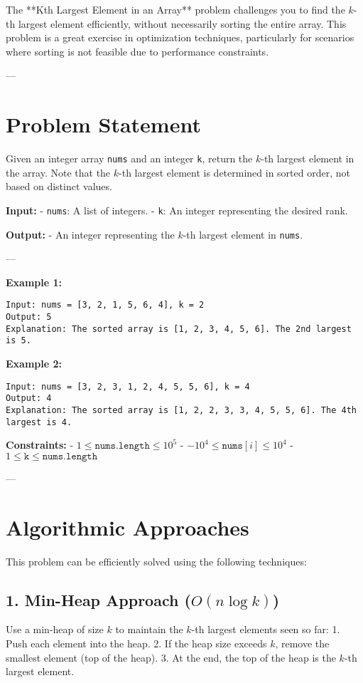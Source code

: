 
\label{problem:Kth_Largest_Element}

The **Kth Largest Element in an Array** problem challenges you to find the \(k\)-th largest element efficiently, without necessarily sorting the entire array. This problem is a great exercise in optimization techniques, particularly for scenarios where sorting is not feasible due to performance constraints.

---

\section*{Problem Statement}
Given an integer array \texttt{nums} and an integer \texttt{k}, return the \(k\)-th largest element in the array. Note that the \(k\)-th largest element is determined in sorted order, not based on distinct values.

\textbf{Input:}
- \texttt{nums}: A list of integers.
- \texttt{k}: An integer representing the desired rank.

\textbf{Output:}
- An integer representing the \(k\)-th largest element in \texttt{nums}.

---

\textbf{Example 1:}
\begin{verbatim}
Input: nums = [3, 2, 1, 5, 6, 4], k = 2
Output: 5
Explanation: The sorted array is [1, 2, 3, 4, 5, 6]. The 2nd largest is 5.
\end{verbatim}

\textbf{Example 2:}
\begin{verbatim}
Input: nums = [3, 2, 3, 1, 2, 4, 5, 5, 6], k = 4
Output: 4
Explanation: The sorted array is [1, 2, 2, 3, 3, 4, 5, 5, 6]. The 4th largest is 4.
\end{verbatim}

\textbf{Constraints:}
- \(1 \leq \texttt{nums.length} \leq 10^5\)
- \(-10^4 \leq \texttt{nums}[i] \leq 10^4\)
- \(1 \leq \texttt{k} \leq \texttt{nums.length}\)

---

\section*{Algorithmic Approaches}

This problem can be efficiently solved using the following techniques:

\subsection*{1. Min-Heap Approach (\(O(n \log k)\))}
Use a min-heap of size \(k\) to maintain the \(k\)-th largest elements seen so far:
1. Push each element into the heap.
2. If the heap size exceeds \(k\), remove the smallest element (top of the heap).
3. At the end, the top of the heap is the \(k\)-th largest element.

